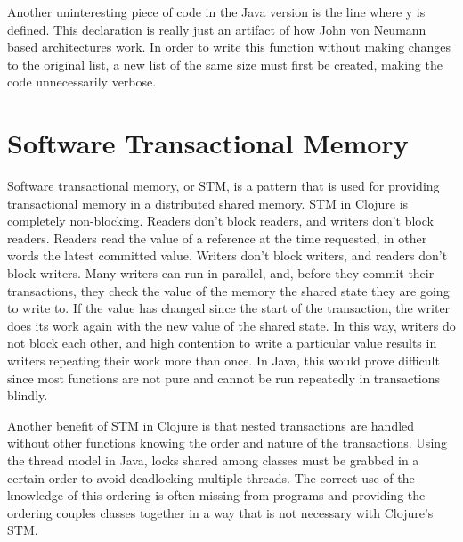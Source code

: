 Another uninteresting piece of code in the Java version is the line where y is defined. 
This declaration is really just an artifact of how John von Neumann based architectures work. In order to write this function without making changes to 
the original list, a new list of the same size must first be created, making the code unnecessarily verbose. 

\section{Software Transactional Memory}
Software transactional memory, or STM, is a pattern that is used for providing transactional memory in a distributed shared memory\cite{stm}. STM in Clojure is completely non-blocking. Readers don't block readers, and writers don't block readers. Readers read the value of a reference at the time requested, in other words the latest committed value. Writers don't block writers, and readers don't block writers. Many writers can run in parallel, and, before they commit their transactions, they check the value of the memory the shared state they are going to write to. If the value has changed since the start of the transaction, the writer does its work again with the new value of the shared state. In this way, writers do not block each other, and high contention to write a particular value results in writers repeating their work more than once. In Java, this would prove difficult since most functions are not pure and cannot be run repeatedly in transactions blindly. 

Another benefit of STM in Clojure is that nested transactions are handled without other functions knowing the order and nature of the transactions. Using the thread model in Java, locks shared among classes must be grabbed in a certain order to avoid deadlocking multiple threads. The correct use of the knowledge of this ordering is often missing from programs and providing the ordering couples classes together in a way that is not necessary with Clojure's STM.  


